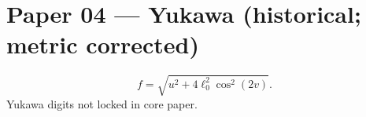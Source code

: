 \documentclass[11pt]{article}
\begin{document}
\section*{Paper 04 — Yukawa (historical; metric corrected)}
\[
f=\sqrt{u^2+4\ell_0^2\cos^2(2v)}.
\]
Yukawa digits not locked in core paper.
\end{document}
